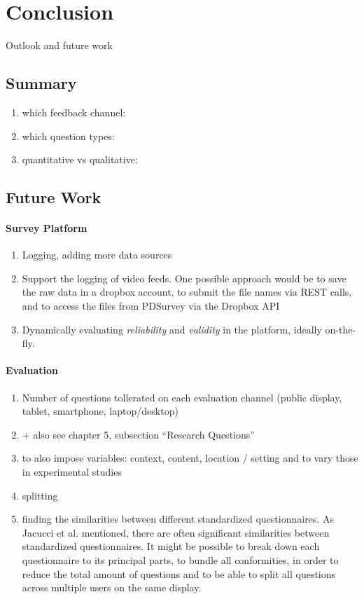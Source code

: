 \section{Conclusion}
\label{sec:conclusion}

Outlook and future work



\subsection{Summary}

\begin{enumerate}
\item which feedback channel:
\item which question types: 
\item quantitative vs qualitative: 
\end{enumerate}


\subsection{Future Work}


\paragraph{Survey Platform}

	\begin{enumerate}
	\item Logging, adding more data sources
	\item Support the logging of video feeds. One possible approach would be to save the raw data in a dropbox account, to submit the file names via REST calls, and to access the files from PDSurvey via the Dropbox API
	\item Dynamically evaluating \textit{reliability} and \textit{validity} in the platform, ideally on-the-fly.
	\end{enumerate}


\paragraph{Evaluation}

	\begin{enumerate}
	\item Number of questions tollerated on each evaluation channel (public display, tablet, smartphone, laptop/desktop)
	\item + also see chapter 5, subsection ``Research Questions'' 
	\item to also impose variables: context, content, location / setting and to vary those in experimental studies
	\item splitting 
	\item finding the similarities between different standardized questionnaires. As Jacucci et al. \cite{jacucci2010worldsofinformation} mentioned, there are often significant similarities between standardized questionnaires. It might be possible to break down each questionnaire to its principal parts, to bundle all conformities, in order to reduce the total amount of questions and to be able to split all questions across multiple users on the same display.
	\end{enumerate}

